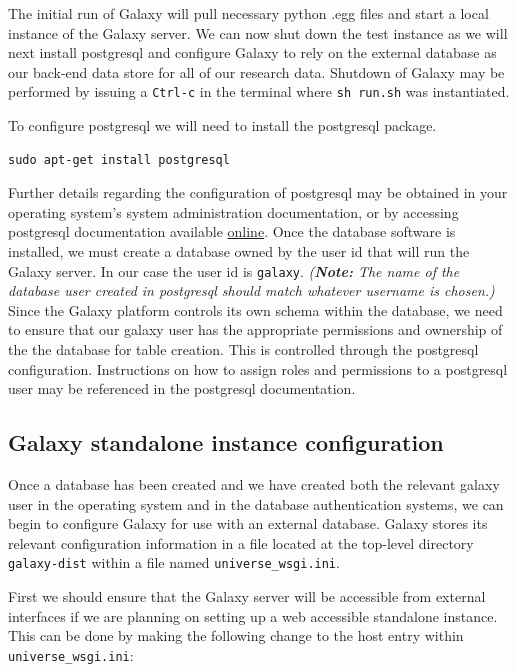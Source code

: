 \documentclass[a4paper,10pt]{article}
\begin{document}
The initial run of Galaxy will pull necessary python .egg files and start a local instance of the Galaxy server.  We can now shut down the test instance as we will next install postgresql and configure Galaxy to rely on the external database as our back-end data store for all of our research data.  Shutdown of Galaxy may be performed by issuing a \texttt{\footnotesize{Ctrl-c}} in the terminal where \texttt{\footnotesize{sh run.sh}} was instantiated.

To configure postgresql we will need to install the postgresql package.

\begin{lstlisting}
sudo apt-get install postgresql
\end{lstlisting}

Further details regarding the configuration of postgresql may be obtained in your operating system's system administration documentation, or by accessing postgresql documentation available \href{http://www.postgresql.org/}{online}.  Once the database software is installed, we must create a database owned by the user id that will run the Galaxy server.  In our case the user id is \texttt{\footnotesize{galaxy}}.  \textit{(\textbf{Note:} The name of the database user created in postgresql should match whatever username is chosen.)}  Since the Galaxy platform controls its own schema within the database, we need to ensure that our galaxy user has the appropriate permissions and ownership of the the database for table creation.  This is controlled through the postgresql configuration.  Instructions on how to assign roles and permissions to a postgresql user may be referenced in the postgresql documentation.

\subsection{Galaxy standalone instance configuration}
Once a database has been created and we have created both the relevant galaxy user in the operating system and in the database authentication systems, we can begin to configure Galaxy for use with an external database.
Galaxy stores its relevant configuration information in a file located at the top-level directory \texttt{\footnotesize{galaxy-dist}} within a file named \texttt{\footnotesize{universe\_wsgi.ini}}.

First we should ensure that the Galaxy server will be accessible from external interfaces if we are planning on setting up a web accessible standalone instance.  This can be done by making the following change to the host entry within \texttt{\footnotesize{universe\_wsgi.ini}}:
\end{document}
